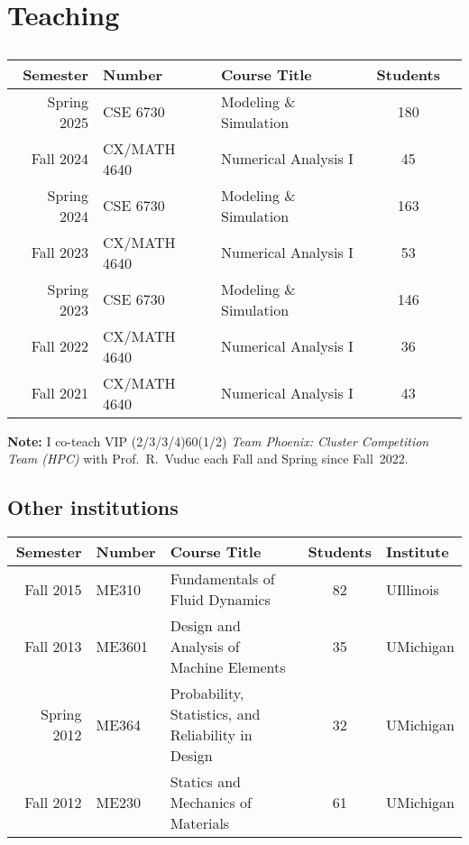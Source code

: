\section{Teaching}

\subsection{\GIT}

\begin{center}
    \begin{longtable}{ r l l c c }
        \bf Semester&\bf Number     & \bf Course Title                  & \bf Students  \\ \midrule
        Spring 2025 & CSE 6730       & Modeling \& Simulation           & 180 \\
        Fall 2024   & CX/MATH 4640   & Numerical Analysis I             & \phantom{1}45 \\
        Spring 2024 & CSE 6730       & Modeling \& Simulation           & 163 \\
        Fall 2023   & CX/MATH 4640   & Numerical Analysis I             & \phantom{1}53 \\
        Spring 2023 & CSE 6730       & Modeling \& Simulation           & 146           \\
        Fall 2022   & CX/MATH 4640   & Numerical Analysis I             & \phantom{1}36 \\
        Fall 2021   & CX/MATH 4640   & Numerical Analysis I             & \phantom{1}43 
    \end{longtable}
\end{center}
\vspace{-0.8cm}
\textbf{Note:} I co-teach VIP (2/3/3/4)60(1/2) \textit{Team Phoenix: Cluster Competition Team (HPC)} with Prof.~R.~Vuduc each Fall and Spring since Fall~2022.

\subsection{Other institutions}

\begin{center}
    \begin{tabular}{ r l l c l }
        \bf Semester  &\bf Number & \bf Course Title & \bf Students & \bf Institute \\
        \midrule
        Fall   2015 & ME310  & Fundamentals of Fluid Dynamics & 82 & UIllinois \\
        Fall   2013 & ME3601 & Design and Analysis of Machine Elements & 35 & UMichigan\\
        Spring 2012 & ME364  & Probability, Statistics, and Reliability in Design & 32 & UMichigan \\
        Fall   2012 & ME230  & Statics and Mechanics of Materials & 61 & UMichigan \\
    \end{tabular}
\end{center}

